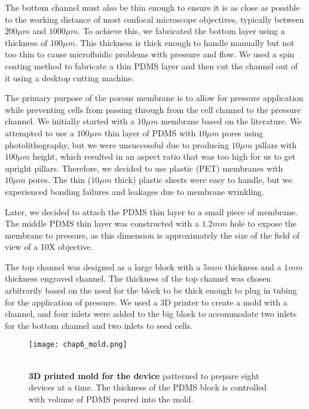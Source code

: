 The bottom channel must also be thin enough to ensure it is as close as
possible to the working distance of most confocal microscope objectives,
typically between \(200\mu m\) and \(1000 \mu m\). To achieve this, we
fabricated the bottom layer using a thickness of \(100 \mu m\). This
thickness is thick enough to handle manually but not too thin to cause
microfluidic problems with pressure and flow. We used a spin coating
method to fabricate a thin PDMS layer and then cut the channel out of it
using a desktop cutting machine.

The primary purpose of the porous membrane is to allow for pressure
application while preventing cells from passing through from the cell
channel to the pressure channel. We initially started with a \(10\mu m\)
membrane based on the literature. We attempted to use a \(100 \mu m\)
thin layer of PDMS with \(10\mu m\) pores using photolithography, but we
were unsuccessful due to producing \(10\mu m\) pillars with
\(100 \mu m\) height, which resulted in an aspect ratio that was too
high for us to get upright pillars. Therefore, we decided to use plastic
(PET) membranes with \(10\mu m\) pores. The thin (\(10\mu m\) thick)
plastic sheets were easy to handle, but we experienced bonding failures
and leakages due to membrane wrinkling.

Later, we decided to attach the PDMS thin layer to a small piece of
membrane. The middle PDMS thin layer was constructed with a \(1.2 mm\)
hole to expose the membrane to pressure, as this dimension is
approximately the size of the field of view of a 10X objective.

The top channel was designed as a large block with a \(5mm\) thickness
and a \(1mm\) thickness engraved channel. The thickness of the top
channel was chosen arbitrarily based on the need for the block to be
thick enough to plug in tubing for the application of pressure. We used
a 3D printer to create a mold with a channel, and four inlets were added
to the big block to accommodate two inlets for the bottom channel and
two inlets to seed cells.


\begin{figure}[h]
	\begin{minipage}[c]{0.6\textwidth}
		\texttt{[image: chap6\_mold.png]}
	\end{minipage}\hfill
	\begin{minipage}[c]{0.35\textwidth}
		\caption{\\ \textbf{3D printed mold for the device} patterned to prepare eight devices at a time. The thickness of the PDMS block is controlled with volume of PDMS poured into the mold.
		}\label{fig_6_1a}
	\end{minipage}
\end{figure}



